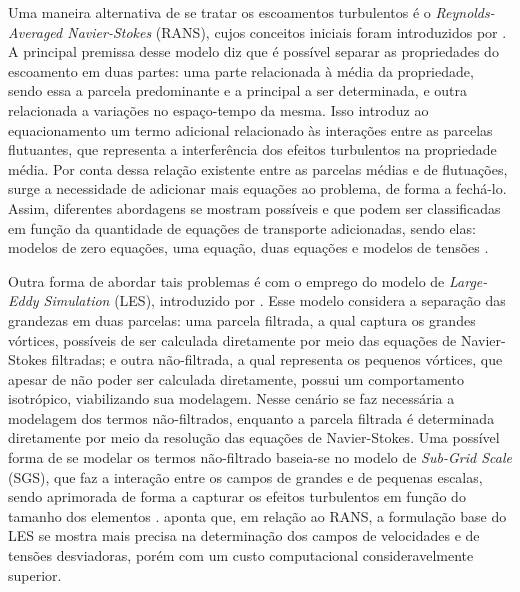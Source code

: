Uma maneira alternativa de se tratar os escoamentos turbulentos é o \textit{Reynolds-Averaged Navier-Stokes} (RANS), cujos conceitos iniciais foram introduzidos por . A principal premissa desse modelo diz que é possível separar as propriedades do escoamento em duas partes: uma parte relacionada à média da propriedade, sendo essa a parcela predominante e a principal a ser determinada, e outra relacionada a variações no espaço-tempo da mesma. Isso introduz ao equacionamento um termo adicional relacionado às interações entre as parcelas flutuantes, que representa a interferência dos efeitos turbulentos na propriedade média. Por conta dessa relação existente entre as parcelas médias e de flutuações, surge a necessidade de adicionar mais equações ao problema, de forma a fechá-lo. Assim, diferentes abordagens se mostram possíveis e que podem ser classificadas em função da quantidade de equações de transporte adicionadas, sendo elas: modelos de zero equações, uma equação, duas equações e modelos de tensões \cite{piomelli1999large,alfonsi2009reynolds,bazilevs2010large,ling2015evaluation}.

Outra forma de abordar tais problemas é com o emprego do modelo de \textit{Large-Eddy Simulation} (LES), introduzido por . Esse modelo considera a separação das grandezas em duas parcelas: uma parcela filtrada, a qual captura os grandes vórtices, possíveis de ser calculada diretamente por meio das equações de Navier-Stokes filtradas; e outra não-filtrada, a qual representa os pequenos vórtices, que apesar de não poder ser calculada diretamente, possui um comportamento isotrópico, viabilizando sua modelagem. Nesse cenário se faz necessária a modelagem dos termos não-filtrados, enquanto a parcela filtrada é determinada diretamente por meio da resolução das equações de Navier-Stokes. Uma possível forma de se modelar os termos não-filtrado baseia-se no modelo de \textit{Sub-Grid Scale} (SGS), que faz a interação entre os campos de grandes e de pequenas escalas, sendo aprimorada de forma a capturar os efeitos turbulentos em função do tamanho dos elementos \cite{ghosal1995basic,hughes2000large,moeng2015large}.  aponta que, em relação ao RANS, a formulação base do LES se mostra mais precisa na determinação dos campos de velocidades e de tensões desviadoras, porém com um custo computacional consideravelmente superior.

